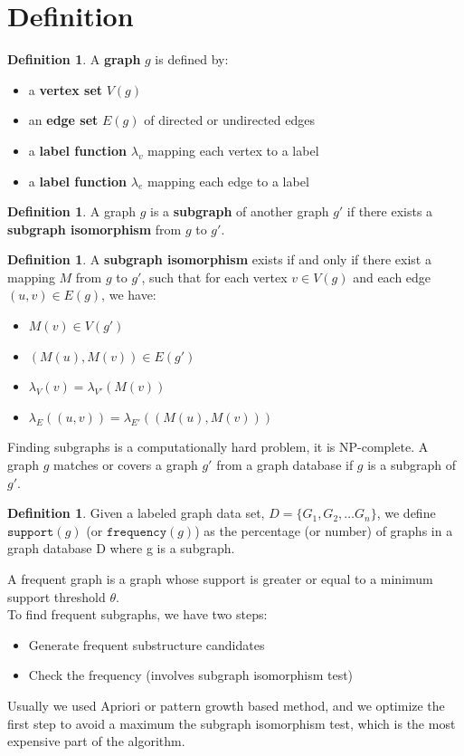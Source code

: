 \documentclass[12pt, openany]{report}
\theoremstyle{definition}
\newtheorem{definition}[thm]{Definition}
\begin{document}
\section{Definition}
\begin{definition}
    A \textbf{graph} $g$ is defined by:
    \begin{itemize}
        \item a \textbf{vertex set} $V(g)$
        \item an \textbf{edge set} $E(g)$ of directed or undirected edges
        \item a \textbf{label function} $\lambda_v$ mapping each vertex to a label
        \item a \textbf{label function} $\lambda_e$ mapping each edge to a label
    \end{itemize}
\end{definition}
\begin{definition}
    A graph $g$ is a \textbf{subgraph} of another graph $g'$ if there exists a \textbf{subgraph isomorphism} from $g$ to $g'$.
\end{definition}
\begin{definition}
    A \textbf{subgraph isomorphism} exists if and only if there exist a mapping $M$ from $g$ to $g'$, such that for each vertex $v \in V (g)$ and each edge $(u, v ) \in E (g )$, we have: 
    \begin{itemize}
        \item $M(v) \in V(g')$
        \item $(M(u), M(v)) \in E(g')$
        \item $\lambda_V(v) = \lambda_{V'}(M(v))$
        \item $\lambda_E((u, v)) = \lambda_{E'}((M(u), M(v)))$
    \end{itemize}
\end{definition}
Finding subgraphs is a computationally hard problem, it is NP-complete. A graph $g$ matches or covers a graph $g'$ from a graph database if $g$ is a subgraph of $g'$.
\begin{definition}
    Given a labeled graph data set, $D = \{G_1, G_2, \dots G_n\}$, we define $\texttt{support}(g)$ (or $\texttt{frequency}(g)$) as the percentage (or number) of graphs in a graph database D where g is a subgraph.
\end{definition}
A frequent graph is a graph whose support is greater or equal to a minimum support threshold $\theta$.\\
To find frequent subgraphs, we have two steps:
\begin{itemize}
    \item Generate frequent substructure candidates 
    \item Check the frequency (involves subgraph isomorphism test)
\end{itemize}
Usually we used Apriori or pattern growth based method, and we optimize the first step to avoid a maximum the subgraph isomorphism test, which is the most expensive part of the algorithm.
\end{document}
